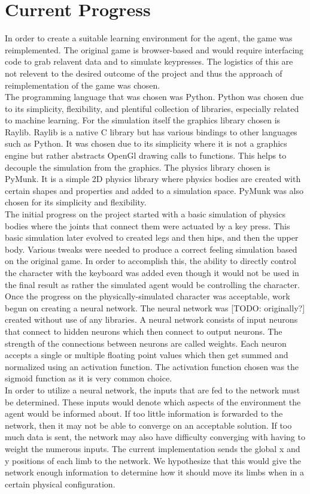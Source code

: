 \documentclass[letterpaper]{article} %
\begin{document}
\section{Current Progress}
\indent In order to create a suitable learning environment for the agent, the game was reimplemented. The original game is browser-based and would require interfacing code to grab relavent data and to simulate keypresses. The logistics of this are not relevent to the desired outcome of the project and thus the approach of reimplementation of the game was chosen. \\
\indent The programming language that was chosen was Python. Python was chosen due to its simplicity, flexibility, and plentiful collection of libraries, especially related to machine learning. For the simulation itself the graphics library chosen is Raylib. Raylib is a native C library but has various bindings to other languages such as Python. It was chosen due to its simplicity where it is not a graphics engine but rather abstracts OpenGl drawing calls to functions. This helps to decouple the simulation from the graphics. The physics library chosen is PyMunk. It is a simple 2D physics library where physics bodies are created with certain shapes and properties and added to a simulation space. PyMunk was also chosen for its simplicity and flexibility. \\
\indent The initial progress on the project started with a basic simulation of physics bodies where the joints that connect them were actuated by a key press. This basic simulation later evolved to created legs and then hips, and then the upper body. Various tweaks were needed to produce a correct feeling simulation based on the original game. In order to accomplish this, the ability to directly control the character with the keyboard was added even though it would not be used in the final result as rather the simulated agent would be controlling the character. \\
\indent Once the progress on the physically-simulated character was acceptable, work begun on creating a neural network. The neural network was [TODO: originally?] created without use of any libraries. A neural network consists of input neurons that connect to hidden neurons which then connect to output neurons. The strength of the connections between neurons are called weights. Each neuron accepts a single or multiple floating point values which then get summed and normalized using an activation function. The activation function chosen was the sigmoid function as it is very common choice. \\
\indent In order to utilize a neural network, the inputs that are fed to the network must be determined. These inputs would denote which aspects of the environment the agent would be informed about. If too little information is forwarded to the network, then it may not be able to converge on an acceptable solution. If too much data is sent, the network may also have difficulty converging with having to weight the numerous inputs. The current implementation sends the global x and y positions of each limb to the network. We hypothesize that this would give the network enough information to determine how it should move its limbs when in a certain physical configuration.
\end{document}

